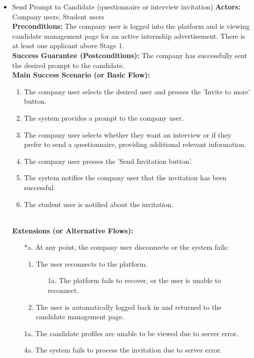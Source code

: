 \begin{itemize}[label={[\textbf{UC}]}, align=left, leftmargin=*]
    \item {} Send Prompt to Candidate (questionnaire or interview invitation)
    \textbf{Actors:} Company users, Student users\\
     \textbf{Preconditions:} The company user is logged into the platform and is viewing candidate management page for an active internship advertisement. There is at least one applicant above Stage 1.\\
     \textbf{Success Guarantee (Postconditions):} The company has successfully sent the desired prompt to the candidate. \\
     \textbf{Main Success Scenario (or Basic Flow):} 
     \begin{enumerate}[label=\arabic*.] 
        \item The company user selects the desired user and presses the 'Invite to more' button.
        \item The system provides a prompt to the company user.
        \item The company user selects whether they want an interview or if they prefer to send a questionnaire, providing additional relevant information.
        \item The company user presses the 'Send Invitation button'.
        \item The system notifies the company user that the invitation has been successful.
        \item The student user is notified about the invitation.
     \end{enumerate} \\

    \textbf{Extensions (or Alternative Flows):} 
    \begin{enumerate}[label=\arabic*.]
        \item[*a.] At any point, the company user disconnects or the system fails:
            \begin{enumerate}[label=\arabic*.]
                \item The user reconnects to the platform.
                    \begin{enumerate}[label=\alph*.]
                        \item[1a.] The platform fails to recover, or the user is unable to reconnect.
                    \end{enumerate}
                 \item The user is automatically logged back in and returned to the candidate management page.
            \end{enumerate}
        \item[1a.] The candidate profiles are unable to be viewed due to server error. 
        \item[4a.] The system fails to process the invitation due to server error.
        \end{enumerate}


\end{itemize}
